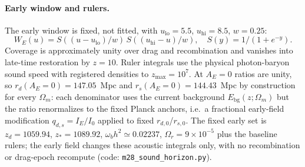 \paragraph{Early window and rulers.}
The early window is fixed, not fitted, with
$u_{\mathrm{lo}} = 5.5$, $u_{\mathrm{hi}} = 8.5$, $w = 0.25$:
\begin{equation}
W_{E}(u) = S((u-u_{\mathrm{lo}})/w)\,S((u_{\mathrm{hi}}-u)/w),
\quad S(y) = 1/(1+e^{-y}).
\end{equation}
Coverage is approximately unity over drag and recombination and vanishes
into late-time restoration by $z = 10$. Ruler integrals use the physical
photon-baryon sound speed with registered densities to
$z_{\max} = 10^{7}$. At $A_{E} = 0$ ratios are unity, so
$r_{d}(A_{E}=0)=147.05$~Mpc and $r_{s}(A_{E}=0)=144.43$~Mpc by
construction for every $\Omega_{m}$: each denominator uses the current
background $E_{\mathrm{bg}}(z;\Omega_{m})$ but the ratio renormalizes
to the fixed Planck anchors, i.e.\ a fractional early-field
modification $q_{d,s}=I_{E}/I_{0}$ applied to fixed
$r_{d,0}$/$r_{s,0}$. The fixed early set is
$z_{d}=1059.94$, $z_{*}=1089.92$,
$\omega_{b}h^{2}\simeq0.02237$, $\Omega_{r}=9\times10^{-5}$ plus the
baseline rulers; the early field changes these acoustic integrals
only, with no recombination or drag-epoch recompute
(code: \texttt{m28\_sound\_horizon.py}).
